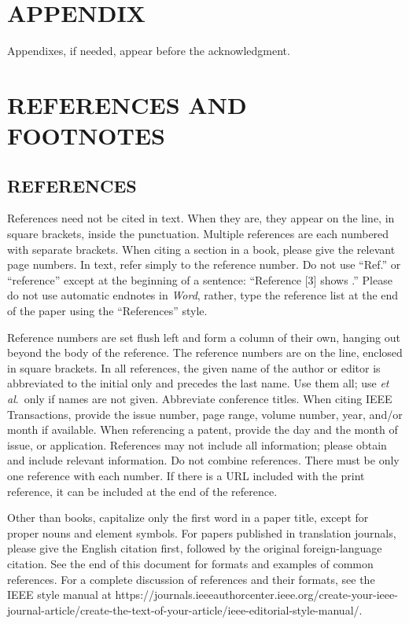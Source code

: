 \documentclass{ieeetmlcn}
\begin{document}
\section*{APPENDIX}
Appendixes, if needed, appear before the acknowledgment.

\section*{REFERENCES AND FOOTNOTES}
\subsection{REFERENCES}
References need not be cited in text. When they are, they appear on the
line, in square brackets, inside the punctuation. Multiple references are
each numbered with separate brackets. When citing a section in a book,
please give the relevant page numbers. In text, refer simply to the
reference number. Do not use ``Ref.'' or ``reference'' except at the
beginning of a sentence: ``Reference [3] shows \textellipsis .'' Please do not use
automatic endnotes in \textit{Word}, rather, type the reference list at the end of the
paper using the ``References'' style.

Reference numbers are set flush left and form a column of their own, hanging
out beyond the body of the reference. The reference numbers are on the line,
enclosed in square brackets. In all references, the given name of the author
or editor is abbreviated to the initial only and precedes the last name. Use
them all; use \textit{et al}.\ only if names are not given.
Abbreviate conference titles. When citing IEEE Transactions,
provide the issue number, page range, volume number, year, and/or month if
available. When referencing a patent, provide the day and the month of
issue, or application. References may not include all information; please
obtain and include relevant information. Do not combine references. There
must be only one reference with each number. If there is a URL included with
the print reference, it can be included at the end of the reference.

Other than books, capitalize only the first word in a paper title, except
for proper nouns and element symbols. For papers published in translation
journals, please give the English citation first, followed by the original
foreign-language citation. See the end of this document for formats and
examples of common references. For a complete discussion of references and
their formats, see the IEEE style manual at 
https://\discretionary{}{}{}journals.ieeeauthorcenter.ieee.org/\discretionary{}{}{}create-your-ieee-journal-article/\discretionary{}{}{}create-the-text-of-your-article/\discretionary{}{}{}ieee-editorial-style-manual/.
\end{document}
